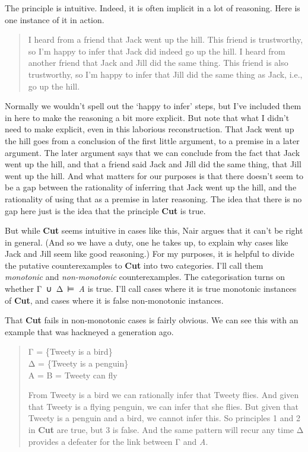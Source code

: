 \documentclass[
  11pt,
]{book}
\begin{document}
The principle is intuitive. Indeed, it is often implicit in a lot of reasoning. Here is one instance of it in action.

\begin{quote}
I heard from a friend that Jack went up the hill. This friend is trustworthy, so I'm happy to infer that Jack did indeed go up the hill. I heard from another friend that Jack and Jill did the same thing. This friend is also trustworthy, so I'm happy to infer that Jill did the same thing as Jack, i.e., go up the hill.
\end{quote}

Normally we wouldn't spell out the `happy to infer' steps, but I've included them in here to make the reasoning a bit more explicit. But note that what I didn't need to make explicit, even in this laborious reconstruction. That Jack went up the hill goes from a conclusion of the first little argument, to a premise in a later argument. The later argument says that we can conclude from the fact that Jack went up the hill, and that a friend said Jack and Jill did the same thing, that Jill went up the hill. And what matters for our purposes is that there doesn't seem to be a gap between the rationality of inferring that Jack went up the hill, and the rationality of using that as a premise in later reasoning. The idea that there is no gap here just is the idea that the principle \textbf{Cut} is true.

But while \textbf{Cut} seems intuitive in cases like this, Nair argues that it can't be right in general. (And so we have a duty, one he takes up, to explain why cases like Jack and Jill seem like good reasoning.) For my purposes, it is helpful to divide the putative counterexamples to \textbf{Cut} into two categories. I'll call them \emph{monotonic} and \emph{non-monotonic} counterexamples. The categorisation turns on whether Γ~∪~Δ~⊨~\emph{A} is true. I'll call cases where it is true monotonic instances of \textbf{Cut}, and cases where it is false non-monotonic instances.

That \textbf{Cut} fails in non-monotonic cases is fairly obvious. We can see this with an example that was hackneyed a generation ago.

\begin{quote}
Γ = \{Tweety is a bird\}\\
Δ = \{Tweety is a penguin\}\\
A = B = Tweety can fly

From Tweety is a bird we can rationally infer that Tweety flies. And given that Tweety is a flying penguin, we can infer that she flies. But given that Tweety is a penguin and a bird, we cannot infer this. So principles 1 and 2 in \textbf{Cut} are true, but 3 is false. And the same pattern will recur any time Δ provides a defeater for the link between Γ and \emph{A}.
\end{quote}
\end{document}
